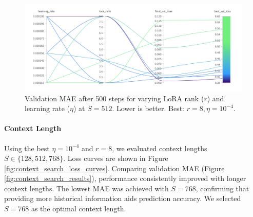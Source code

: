 \documentclass{article}
\begin{document}
\begin{figure}[!htbp]
    \centering
    \includegraphics[width=0.8\linewidth]{M2 Course Work//Images/grid_search_result.png}
    \caption{Validation MAE after 500 steps for varying LoRA rank ($r$) and learning rate ($\eta$) at $S=512$. Lower is better. Best: $r=8, \eta=10^{-4}$.} %
    \label{fig:grid_search_lr_rank_results}
\end{figure}

\paragraph{Context Length}
Using the best $\eta=10^{-4}$ and $r=8$, we evaluated context lengths $S \in \{128, 512, 768\}$. Loss curves are shown in Figure \ref{fig:context_search_loss_curves}. Comparing validation MAE (Figure \ref{fig:context_search_results}), performance consistently improved with longer context lengths. The lowest MAE was achieved with $S=768$, confirming that providing more historical information aids prediction accuracy. We selected $S=768$ as the optimal context length.
\end{document}
